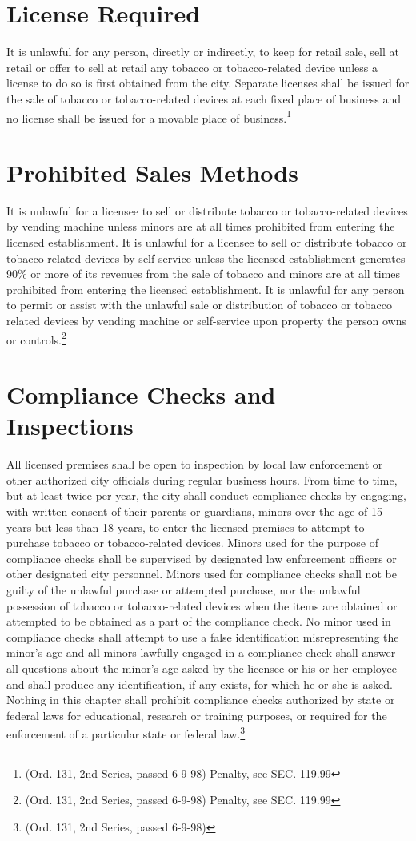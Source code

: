 \section{License Required}
It is unlawful for any person, directly or indirectly, to keep for retail sale, sell at retail or offer to sell at retail any tobacco or tobacco-related device unless a license to do so is first obtained from the city.  Separate licenses shall be issued for the sale of tobacco or tobacco-related devices at each fixed place of business and no license shall be issued for a movable place of business.\footnote{(Ord. 131, 2nd Series, passed 6-9-98)  Penalty, see SEC. 119.99}
\section{Prohibited Sales Methods}
It is unlawful for a licensee to sell or distribute tobacco or tobacco-related devices by vending machine unless minors are at all times prohibited from entering the licensed establishment.  It is unlawful for a licensee to sell or distribute tobacco or tobacco related devices by self-service unless the licensed establishment generates 90\% or more of its revenues from the sale of tobacco and minors are at all times prohibited from entering the licensed establishment.  It is unlawful for any person to permit or assist with the unlawful sale or distribution of tobacco or tobacco related devices by vending machine or self-service upon property the person owns or controls.\footnote{(Ord. 131, 2nd Series, passed 6-9-98)  Penalty, see SEC. 119.99}
\section{Compliance Checks and Inspections}
All licensed premises shall be open to inspection by local law enforcement or other authorized city officials during regular business hours. From time to time, but at least twice per year, the city shall conduct compliance checks by engaging, with written consent of their parents or guardians, minors over the age of 15 years but less than 18 years, to enter the licensed premises to attempt to purchase tobacco or tobacco-related devices. Minors used for the purpose of compliance checks shall be supervised by designated law enforcement officers or other designated city personnel.  Minors used for compliance checks shall not be guilty of the unlawful purchase or attempted purchase, nor the unlawful possession of tobacco or tobacco-related devices when the items are obtained or attempted to be obtained as a part of the compliance check. No minor used in compliance checks shall attempt to use a false identification misrepresenting the minor’s age and all minors lawfully engaged in a compliance check shall answer all questions about the minor’s age asked by the licensee or his or her employee and shall produce any identification, if any exists, for which he or she is asked.  Nothing in this chapter shall prohibit compliance checks authorized by state or federal laws for educational, research or training purposes, or required for the enforcement of a particular state or federal law.\footnote{(Ord. 131, 2nd Series, passed 6-9-98)}
